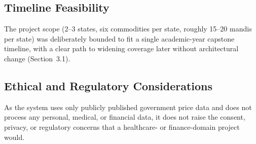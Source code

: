 \subsection{Timeline Feasibility}
The project scope (2--3 states, six commodities per state, roughly
15--20 mandis per state) was deliberately bounded to fit a single
academic-year capstone timeline, with a clear path to widening coverage
later without architectural change (Section~3.1).

\subsection{Ethical and Regulatory Considerations}
As the system uses only publicly published government price data and
does not process any personal, medical, or financial data, it does not
raise the consent, privacy, or regulatory concerns that a healthcare- or
finance-domain project would.
